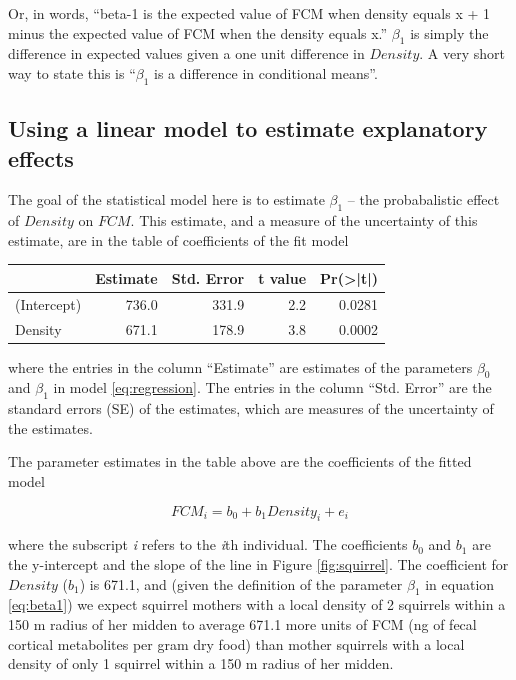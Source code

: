\documentclass[]{book}
\begin{document}
Or, in words, ``beta-1 is the expected value of FCM when density equals
x + 1 minus the expected value of FCM when the density equals x.''
\(\beta_1\) is simply the difference in expected values given a one unit
difference in \(Density\). A very short way to state this is
``\(\beta_1\) is a difference in conditional means''.

\subsection{Using a linear model to estimate explanatory
effects}\label{using-a-linear-model-to-estimate-explanatory-effects}

The goal of the statistical model here is to estimate \(\beta_1\) -- the
probabalistic effect of \(Density\) on \(FCM\). This estimate, and a
measure of the uncertainty of this estimate, are in the table of
coefficients of the fit model

\begin{tabular}{l|r|r|r|r}
\hline
  & Estimate & Std. Error & t value & Pr(>|t|)\\
\hline
(Intercept) & 736.0 & 331.9 & 2.2 & 0.0281\\
\hline
Density & 671.1 & 178.9 & 3.8 & 0.0002\\
\hline
\end{tabular}

where the entries in the column ``Estimate'' are estimates of the
parameters \(\beta_0\) and \(\beta_1\) in model \eqref{eq:regression}. The
entries in the column ``Std. Error'' are the standard errors (SE) of the
estimates, which are measures of the uncertainty of the estimates.

The parameter estimates in the table above are the coefficients of the
fitted model

\begin{equation}
FCM_i = b_0 + b_1 Density_i + e_i
\label{eq:fcmi}
\end{equation}

where the subscript \emph{i} refers to the \emph{i}th individual. The
coefficients \(b_0\) and \(b_1\) are the y-intercept and the slope of
the line in Figure \ref{fig:squirrel}. The coefficient for \(Density\)
(\(b_1\)) is 671.1, and (given the definition of the parameter
\(\beta_1\) in equation \eqref{eq:beta1}) we expect squirrel mothers with
a local density of 2 squirrels within a 150 m radius of her midden to
average 671.1 more units of FCM (ng of fecal cortical metabolites per
gram dry food) than mother squirrels with a local density of only 1
squirrel within a 150 m radius of her midden.
\end{document}
